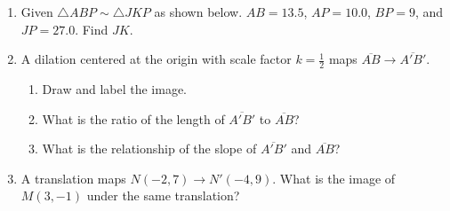 \documentclass[12pt, twoside]{article}
\begin{document}
\begin{enumerate}
\newpage
\item Given $\triangle ABP \sim \triangle JKP$ as shown below. $AB=13.5$, $AP=10.0$, $BP=9$, and $JP=27.0$. Find $JK$.
  \begin{flushright}
    \end{flushright}
    \vspace{0.5cm}

\item A dilation centered at the origin with scale factor $k=\frac{1}{2}$ maps $\overline{AB} \rightarrow \overline{A'B'}$. 
  \begin{multicols}{2}
    \begin{enumerate}
      \item Draw and label the image.
      \item What is the ratio of the length of $\overline{A'B'}$ to $\overline{AB}$?
      \item What is the relationship of the slope of $\overline{A'B'}$ and $\overline{AB}$?
      \begin{flushright}
      \end{flushright}
    \end{enumerate}
    \end{multicols} \vspace{2cm}

\item A translation maps $N(-2, 7) \rightarrow N'(-4,9)$. What is the image of $M(3,-1)$ under the same translation?
      

\end{enumerate}
\end{document}
